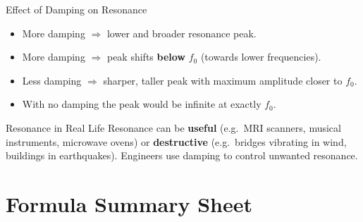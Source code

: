 \begin{keybox}{Effect of Damping on Resonance}
\begin{itemize}[itemsep=2pt]
  \item More damping $\Rightarrow$ lower and broader resonance peak.
  \item More damping $\Rightarrow$ peak shifts \textbf{below} $f_0$ (towards lower frequencies).
  \item Less damping $\Rightarrow$ sharper, taller peak with maximum amplitude closer to $f_0$.
  \item With no damping the peak would be infinite at exactly $f_0$.
\end{itemize}
\end{keybox}

\begin{warningbox}{Resonance in Real Life}
Resonance can be \textbf{useful} (e.g.\ MRI scanners, musical instruments, microwave ovens) or \textbf{destructive} (e.g.\ bridges vibrating in wind, buildings in earthquakes). Engineers use damping to control unwanted resonance.
\end{warningbox}

\section{Formula Summary Sheet}

